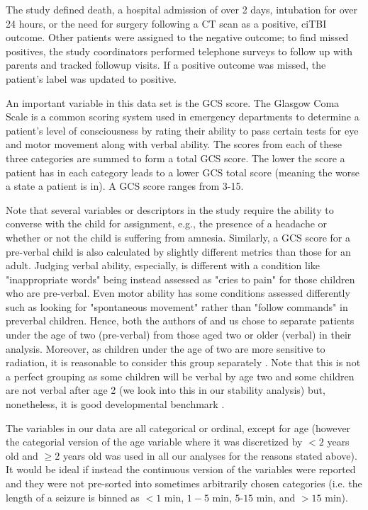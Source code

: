 \documentclass[11pt, letterpaper]{amsart}
\begin{document}
The study defined death, a hospital admission of over 2 days, intubation for over 24 hours, or the need for surgery following a CT scan as a positive, ciTBI outcome. Other patients were assigned to the negative outcome; to find missed positives, the study coordinators performed telephone surveys to follow up with parents and tracked followup visits. If a positive outcome was missed, the patient's label was updated to positive. 

An important variable in this data set is the GCS score. The Glasgow Coma Scale is a common scoring system used in emergency departments to determine a patient's level of consciousness by rating their ability to pass certain tests for eye and motor movement along with verbal ability. The scores from each of these three categories are summed to form a total GCS score. The lower the score a patient has in each category leads to a lower GCS total score (meaning the worse a state a patient is in). A GCS score ranges from 3-15.

Note that several variables or descriptors in the study require the ability to converse with the child for assignment, e.g., the presence of a headache or whether or not the child is suffering from amnesia. Similarly, a GCS score for a pre-verbal child is also calculated by slightly different metrics than those for an adult. Judging verbal ability, especially, is different with a condition like "inappropriate words" being instead assessed as "cries to pain" for those children who are pre-verbal. Even motor ability has some conditions assessed differently such as looking for "spontaneous
movement" rather than "follow commands" in preverbal children. Hence, both the authors of \cite{kuppermann2009identification} and us chose to separate patients under the age of two (pre-verbal) from those aged two or older (verbal) in their analysis. Moreover, as children under the age of two are more sensitive to radiation, it is reasonable to consider this group separately \cite{brenner2002estimating}. Note that this is not a perfect grouping as some children will be verbal by age two and some children are not verbal after age 2 (we look into this in our stability analysis) but, nonetheless, it is good developmental benchmark \cite{blackwell2007pediatric}.

The variables in our data are all categorical or ordinal, except for age (however the categorial version of the age variable where it was discretized by $< 2$ years old and $\geq 2$ years old was used in all our analyses for the reasons stated above). It would be ideal if instead the continuous version of the variables were reported and they were not pre-sorted into sometimes arbitrarily chosen categories (i.e. the length of a seizure is binned as  $< 1$ min, $1 - 5$ min, $5 ‐ 15$ min, and $> 15$ min).
\end{document}
